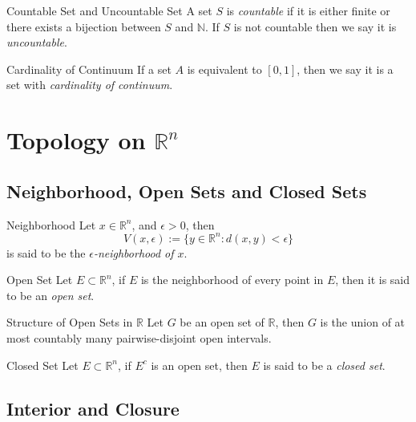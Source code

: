 \begin{definition}{Countable Set and Uncountable Set}{}
  A set $S$ is \emph{countable} if it is either finite or there
  exists a bijection between $S$ and $\mathbb{N}$.
  If $S$ is not countable then we say it is \emph{uncountable}.
\end{definition}

\begin{definition}{Cardinality of Continuum}{}
  If a set $A$ is equivalent to $[0, 1]$,
  then we say it is a set with \emph{cardinality of continuum}.
\end{definition}

\section{Topology on $\mathbb{R}^n$}

\subsection{Neighborhood, Open Sets and Closed Sets}

\begin{definition}{Neighborhood}{}
  Let $x \in \mathbb{R}^n$, and $\epsilon > 0$, then 
  \begin{equation}
    V(x, \epsilon) := \{y \in \mathbb{R}^n: d(x,y) < \epsilon\}
  \end{equation}
  is said to be the \emph{$\epsilon$-neighborhood of $x$}.
\end{definition}

\begin{definition}{Open Set}{}
  Let $E \subset \mathbb{R}^n$, if $E$ is the neighborhood of every point in
  $E$,
  then it is said to be an \emph{open set}.
\end{definition}

\begin{theorem}{Structure of Open Sets in $\mathbb{R}$}{}
  Let $G$ be an open set of $\mathbb{R}$,
  then $G$ is the union of at most countably many pairwise-disjoint open intervals.
\end{theorem}

\begin{definition}{Closed Set}{}
  Let $E \subset \mathbb{R}^n$, if $E^c$ is an open set,
  then $E$ is said to be a \emph{closed set}.
\end{definition}

\subsection{Interior and Closure}

